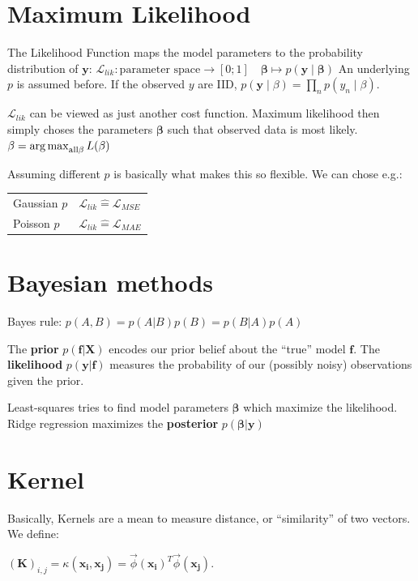 \documentclass[10pt,a4paper,landscape]{article}
\begin{document}
\begin{multicols*}{4}
\section{Maximum Likelihood}
  The Likelihood Function maps the model parameters to the probability distribution of $\mathbf{y}$:
  $\mathcal{L}_{lik}\colon \text{parameter space} \to [0;1]\quad  \mathbf{\beta} \mapsto p(\mathbf{y} \mid  \mathbf{\beta})$
  An underlying $p$ is assumed before. If the observed $y$ are IID, $p(\mathbf{y} \mid \beta) = \prod_n p(y_n \mid \beta)$.

  $\mathcal{L}_{lik}$ can be viewed as just another cost function. Maximum likelihood then simply choses the parameters $\mathbf{\beta}$ such that observed data is most likely. $\beta = \operatorname*{arg\,max}_{\text{all} \beta} L(\beta)$

  Assuming different $p$ is basically what makes this so flexible. We can chose e.g.:

  \begin{tabular}{ l  l }
    \hline
    Gaussian $p$ & $\mathcal{L}_{lik} \widehat{=} \mathcal{L}_{MSE}$ \\
    Poisson $p$  & $\mathcal{L}_{lik} \widehat{=} \mathcal{L}_{MAE}$ \\
    \hline
  \end{tabular}

\section{Bayesian methods}
  Bayes rule: $p(A, B) = p(A|B) p(B) = p(B|A) p(A)$

  The \textbf{prior} $p(\mathbf{f}|\mathbf{X})$ encodes our prior belief about the ``true'' model $\mathbf{f}$. The \textbf{likelihood} $p(\mathbf{y}|\mathbf{f})$ measures the probability of our (possibly noisy) observations given the prior.

  Least-squares tries to find model parameters $\mathbf{\beta}$ which maximize the likelihood. Ridge regression maximizes the \textbf{posterior} $p(\mathbf{\beta}|\mathbf{y})$

\section{Kernel}
  Basically, Kernels are a mean to measure distance, or ``similarity'' of two vectors. We define:

  $(\mathbf{K})_{i,j} = \kappa(\mathbf{x_i}, \mathbf{x_j}) = \vec \phi(\mathbf{x_i})^T \vec \phi(\mathbf{x_j})$.


\end{multicols*}
\end{document}
